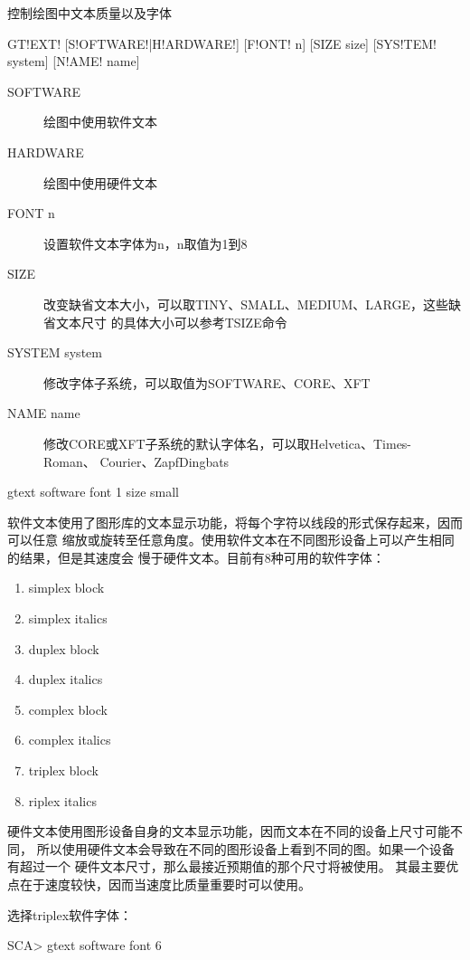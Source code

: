 \label{cmd:gtext}

控制绘图中文本质量以及字体

\begin{SACSTX}
GT!EXT! [S!OFTWARE!|H!ARDWARE!] [F!ONT! n] [SIZE size] [SYS!TEM! system]
    [N!AME! name]
\end{SACSTX}

\begin{description}
\item [SOFTWARE]  绘图中使用软件文本
\item [HARDWARE]  绘图中使用硬件文本
\item [FONT n] 设置软件文本字体为n，n取值为1到8
\item [SIZE]  改变缺省文本大小，可以取TINY、SMALL、MEDIUM、LARGE，这些缺省文本尺寸
    的具体大小可以参考TSIZE命令
\item [SYSTEM system] 修改字体子系统，可以取值为SOFTWARE、CORE、XFT
\item [NAME name] 修改CORE或XFT子系统的默认字体名，可以取Helvetica、Times-Roman、
    Courier、ZapfDingbats
\end{description}

\begin{SACDFT}
gtext software font 1 size small
\end{SACDFT}

软件文本使用了图形库的文本显示功能，将每个字符以线段的形式保存起来，因而可以任意
缩放或旋转至任意角度。使用软件文本在不同图形设备上可以产生相同的结果，但是其速度会
慢于硬件文本。目前有8种可用的软件字体：
\begin{enumerate}
\item simplex block
\item simplex italics
\item duplex block
\item duplex italics
\item complex block
\item complex italics
\item triplex block
\item riplex italics
\end{enumerate}

硬件文本使用图形设备自身的文本显示功能，因而文本在不同的设备上尺寸可能不同，
所以使用硬件文本会导致在不同的图形设备上看到不同的图。如果一个设备有超过一个
硬件文本尺寸，那么最接近预期值的那个尺寸将被使用。
其最主要优点在于速度较快，因而当速度比质量重要时可以使用。

选择triplex软件字体：
\begin{SACCode}
SCA> gtext software font 6
\end{SACCode}
